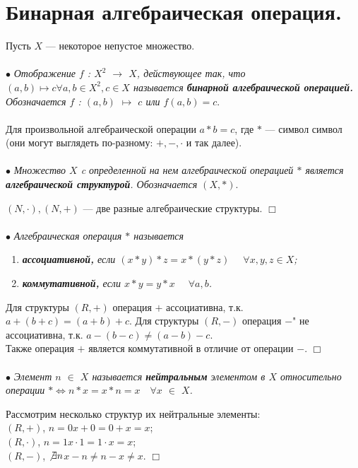 \documentclass[a4paper, 12pt]{report}
\newenvironment{examp} %
{\par\noindent{\textbf{\textsc{Пример:}}}} %
{\hfill$\scriptstyle\Box$}
\begin{document}
	\section{Бинарная алгебраическая операция.}
	Пусть $X$ --- некоторое непустое множество.\\\\
	$\bullet$ \textit{Отображение $f$ : $X^2$ $\rightarrow$ $X$, действующее так, что $(a,b) \mapsto c \forall a,b \in X^2, c \in X$ называется \textbf{бинарной алгебраической операцией.} \\ Обозначается $f$ : $(a,b)$ $\mapsto$ $c$ или $f(a,b) = c$}.\\\\
	Для произвольной алгебраической операции $a * b = c$, где $*$ --- символ символ (они могут выглядеть по-разному: $+, -, \cdot$ и так далее).\\\\
	$\bullet$ \textit{Множество $X$ c определенной на нем алгебраической операцией $*$ является \textbf{алгебраической структурой}. Обозначается $(X, *)$}.\\
	\begin{examp}
		$(N,\cdot), (N,+)$ --- две разные алгебраические структуры.
	\end{examp}\\\\
	$\bullet$ \textit{Алгебраическая операция $*$ называется} \begin{enumerate}
		\item \textit{\textbf{ассоциативной,} если $(x*y)*z = x*(y*z)$ $\quad\forall x, y, z\in X$;}
		\item \textit{\textbf{коммутативной,} если $x*y = y*x$ $\quad\forall a, b$.}
	\end{enumerate}\begin{examp}
		Для структуры $(R,+)$ операция $+$ ассоциативна, т.к. $a + (b+c) = (a+b) + c$. Для структуры $(R, -)$ операция $-$" не ассоциативна, т.к. $a-(b-c)\ne (a-b)-c$.\\
		Также операция $+$ является коммутативной в отличие от операции $-$.
	\end{examp}\\\\
	$\bullet$ \textit{Элемент $n$ $\in$ $X$ называется \textbf{нейтральным} элементом в $X$ относительно операции $* \Longleftrightarrow n * x = x * n = x\quad\forall x$ $\in$ $X$.}\\
	\begin{examp}
		Рассмотрим несколько структур их нейтральные элементы:\\
		$(R, +)$, $n = 0$\quad$x+0 = 0 + x = x$;\\
		$(R, \cdot)$, $n = 1$\quad$x\cdot1 = 1\cdot x= x$;\\
		$(R, -)$, $\not\exists n$\quad$x-n \not= n-x \not= x$.
	\end{examp}
\end{document}
